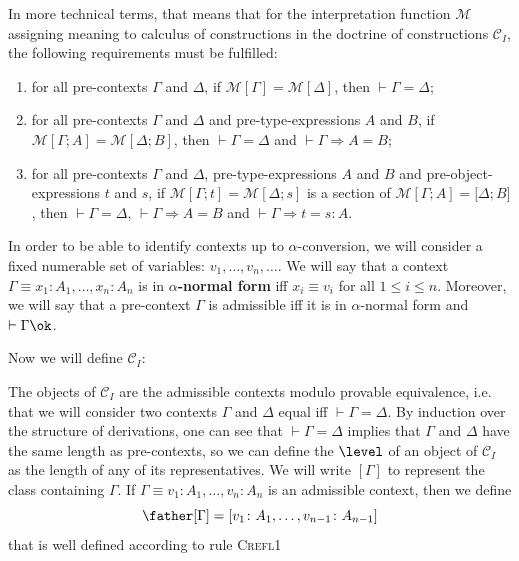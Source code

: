 In more technical terms, that means that for the interpretation function $\mathcal{M}$ assigning meaning
to calculus of constructions in the doctrine of constructions $\mathcal{C}_I$, the following requirements
must be fulfilled:
\begin{enumerate}
    \item for all pre-contexts $\Gamma$ and $\Delta$, if $\mathcal{M}[\Gamma] = \mathcal{M}[\Delta]$,
          then $\vdash \Gamma = \Delta$;
    \item for all pre-contexts $\Gamma$ and $\Delta$ and pre-type-expressions $A$ and $B$, if 
          $\mathcal{M}[\Gamma; A] = \mathcal{M}[\Delta; B]$, then $\vdash \Gamma = \Delta$ and 
          $\vdash \Gamma \Rightarrow A = B$;
    \item for all pre-contexts $\Gamma$ and $\Delta$, pre-type-expressions $A$ and $B$ and pre-object-expressions
          $t$ and $s$, if $\mathcal{M}[\Gamma; t] = \mathcal{M}[\Delta; s]$ is a section of $\mathcal{M}[\Gamma; A] = \mathcal[\Delta; B]$,
          then $\vdash \Gamma = \Delta$, $\vdash \Gamma \Rightarrow A = B$ and $\vdash \Gamma \Rightarrow t = s \colon A$.
\end{enumerate}

In order to be able to identify contexts up to $\alpha$-conversion, we will consider a fixed numerable set of variables:
$v_1, \dots, v_n, \dots$. We will say that a context $\Gamma \equiv x_1 \colon A_1, \dots, x_n \colon A_n$ is in 
\textbf{$\alpha$-normal form} iff $x_i \equiv v_i$ for all $1 \leq i \leq n$.
Moreover, we will say that a pre-context $\Gamma$ is admissible iff it is in $\alpha$-normal form and $\vdash \Gamma \ok$.

Now we will define $\mathcal{C}_I$:

The objects of $\mathcal{C}_I$ are the admissible contexts modulo provable equivalence, i.e. that we will consider 
two contexts $\Gamma$ and $\Delta$ equal iff $\vdash \Gamma = \Delta$.
By induction over the structure of derivations, one can see that $\vdash \Gamma = \Delta$ implies that $\Gamma$ and
$\Delta$ have the same length as pre-contexts, so we can define the $\level$ of an object of $\mathcal{C}_I$ as the length
of any of its representatives. We will write $[\Gamma]$ to represent the class containing $\Gamma$.
If $\Gamma \equiv v_1 \colon A_1, \dots, v_n \colon A_n$ is an admissible context, then we define
\[
    \father[\Gamma] = [ v_1 \colon A_1, \dots, v_{n-1} \colon A_{n-1} ]
\]
that is well defined according to rule \textsc{Crefl1} %

